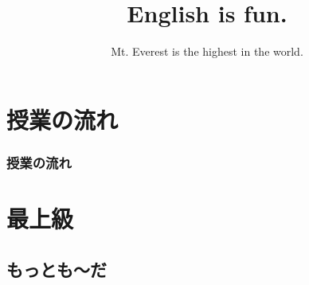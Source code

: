 \documentclass[aspectratio=169,xcolor={dvipsnames,table}]{beamer}
\title{English is fun.}
\subtitle{Mt. Everest is the highest in the world.}
\author{}
\institute[]{}
\date[]
\begin{document}
\begin{frame}[plain]
  \titlepage
\end{frame}

\section*{授業の流れ}
\begin{frame}[plain]
  \frametitle{授業の流れ}
  \tableofcontents
\end{frame}

\section{最上級}
\subsection{もっとも〜だ}
\end{document}
